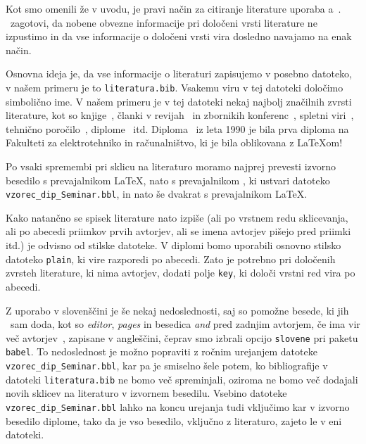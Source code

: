 \documentclass{feridiploma}
\begin{document}
{{	Kot smo omenili že v uvodu, je pravi način za citiranje literature uporaba \BibTeX{}a~\cite{bib}. 
	\BibTeX\ zagotovi, da nobene obvezne informacije pri določeni vrsti literature ne izpustimo in da vse informacije o določeni vrsti vira dosledno navajamo na enak način.
	
	Osnovna ideja  je, da vse informacije o literaturi zapisujemo v posebno datoteko, v našem primeru je to \texttt{literatura.bib}.
	Vsakemu viru v tej datoteki določimo simbolično ime.
	V  našem primeru je v tej datoteki nekaj najbolj značilnih zvrsti literature, kot so knjige~\cite{lamport}, 
	članki v revijah~\cite{leonardo} in zbornikih konferenc~\cite{poglavje_springer}, 
	spletni viri~\cite{bib,slovarcek,video}, 
	tehnično poročilo~\cite{andersen2012kinect}, 
	diplome~\cite{diploma} itd.
	Diploma~\cite{diploma} iz leta 1990 je bila prva diploma na Fakulteti za elektrotehniko in računalništvo, ki je bila oblikovana z \LaTeX om!
	
	Po vsaki spremembi pri sklicu na literaturo moramo najprej prevesti izvorno besedilo s prevajalnikom \LaTeX, nato s prevajalnikom  \BibTeX, ki ustvari datoteko  {\tt vzorec\_dip\_Seminar.bbl}, in nato še dvakrat s prevajalnikom  \LaTeX.
	
	Kako natančno se spisek literature nato izpiše (ali po vrstnem redu sklicevanja, ali po abecedi priimkov prvih avtorjev, ali se imena avtorjev pišejo pred priimki itd.) je odvisno od stilske datoteke.
	V diplomi bomo uporabili osnovno stilsko datoteko \texttt{plain}, ki vire razporedi po abecedi.
	Zato je potrebno pri določenih zvrsteh literature, ki nima avtorjev, dodati polje \texttt{key}, ki določi vrstni red vira po abecedi.
	
	Z uporabo  v slovenščini je še nekaj nedoslednosti, saj so pomožne besede, ki jih \BibTeX\ sam doda,  kot so \textit{editor},  \textit{pages} in besedica  \textit{and} pred zadnjim avtorjem, 
	če ima vir več avtorjev~\cite{andersen2012kinect}, zapisane v angleščini,
	čeprav smo izbrali opcijo \texttt{slovene} pri paketu \texttt{babel}.
	To nedoslednost je možno popraviti z ročnim urejanjem datoteke {\tt vzorec\_dip\_Seminar.bbl}, 
	kar pa je smiselno šele potem, ko bibliografije v datoteki \texttt{literatura.bib} ne bomo več spreminjali,
	oziroma ne bomo več dodajali novih sklicev na literaturo v izvornem besedilu.
	Vsebino datoteke {\tt vzorec\_dip\_Seminar.bbl} lahko na koncu urejanja tudi vključimo kar v izvorno besedilo diplome, tako da je vso besedilo, vključno z literaturo, zajeto le v eni datoteki.
	
}}
\end{document}
